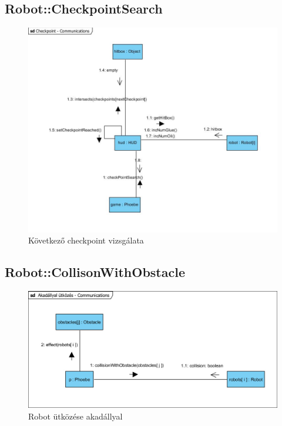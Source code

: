 \subsection{Robot::CheckpointSearch}
\begin{figure}[h]
\begin{center}
\includegraphics[width=17cm]{images/Commdiagrams/Comm_CheckpointSearch.jpg}
\caption{Következő checkpoint vizsgálata}
\label{fig:example2}
\end{center}
\end{figure}
\pagebreak

\subsection{Robot::CollisonWithObstacle}
\begin{figure}[h]
\begin{center}
\includegraphics[width=17cm]{images/Commdiagrams/Comm_CollisionWithObstacle.jpg}
\caption{Robot ütközése akadállyal}
\label{fig:example4}
\end{center}
\end{figure}
\pagebreak

